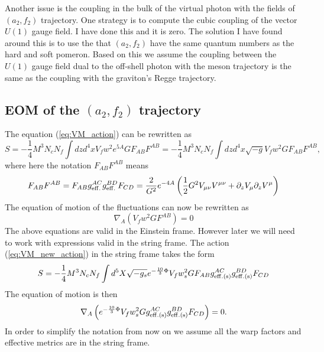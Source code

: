 \documentclass[a4paper,12pt]{article}
\begin{document}
Another issue is the coupling in the bulk of the virtual photon with the fields of  $\left(a_2, f_2\right)$ trajectory. One strategy is to compute the cubic coupling of the vector $U\left(1\right)$ gauge field. I have done this and it is zero. The solution I have found around this is to use the that $\left(a_2, f_2\right)$ have the same quantum numbers as the hard and soft pomeron. Based on this we assume the coupling between the $U\left(1\right)$ gauge field dual to the off-shell photon with the meson trajectory is the same as the coupling with the graviton's Regge trajectory.

\subsection{EOM of the $\left(a_2, f_2\right)$ trajectory}

The equation (\ref{eq:VM_action}) can be rewritten as
\begin{equation}
S = - \frac{1}{4} M^3 N_c N_f \int dz d^4 x V_f w^2 e^{5A} G F_{AB}F^{AB} = - \frac{1}{4} M^3 N_c N_f \int dz d^4 x \sqrt{-g} V_f w^2 G F_{AB}F^{AB},
\label{eq:VM_new_action}
\end{equation}
where here the notation $F_{AB}F^{AB}$ means
\begin{equation}
F_{AB}F^{AB} = F_{AB} g_{\rm{eff.}}^{AC} g_{\rm{eff.}}^{BD} F_{CD} =  \frac{2}{G^2}e^{-4A}\left( \frac{1}{2} G^2 V_{\mu \nu} V^{\mu \nu} + \partial_z V_\mu \partial_z V^\mu \right)
\end{equation}
The equation of motion of the fluctuations can now be rewritten as
\begin{equation}
\nabla_A \left(V_f w^2 G F^{AB} \right) = 0
\end{equation}
The above equations are valid in the Einstein frame. However later we will need to work with expressions valid in the string frame. The action (\ref{eq:VM_new_action}) in the string frame takes the form
\begin{equation}
S = - \frac{1}{4} M^3 N_c N_f \int d^5 X \sqrt{-g_s} e^{-\frac{10}{3} \Phi} V_f w_s^2 G F_{AB}g^{AC}_{\rm{eff. (s)}}g^{BD}_{\rm{eff. (s)}}F_{CD}
\label{eq:VM_new_action_string_frame}
\end{equation}
The equation of motion is then
\begin{equation}
\nabla_{A} \left(e^{-\frac{10}{3} \Phi} V_f w_s^2 G g^{AC}_{\rm{eff. (s)}}g^{BD}_{\rm{eff. (s)}}F_{CD}  \right) = 0.
\label{eq:U1_eom_cov_der}
\end{equation}
In order to simplify the notation from now on we assume all the warp factors and effective metrics are in the string frame.
\end{document}
